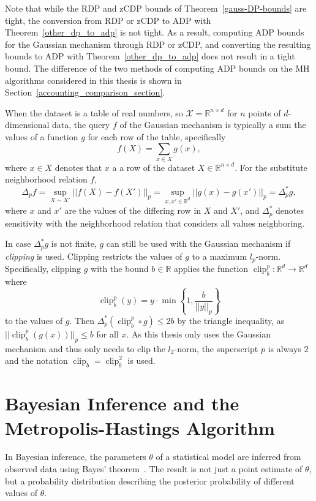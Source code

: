 \documentclass[english,twoside,openright]{HYgraduMLDS}
\newcommand{\R}{\mathbb{R}}
\newcommand{\calx}{{\mathcal{X}}}
\DeclareMathOperator{\clip}{clip}
\begin{document}
Note that while the RDP and zCDP bounds of Theorem~\ref{gauss-DP-bounds} are
tight, the conversion from RDP or zCDP to ADP with Theorem~\ref{other_dp_to_adp}
is not tight. As a result, computing
ADP bounds for the Gaussian mechanism through RDP or zCDP, and converting
the resulting bounds to ADP with Theorem~\ref{other_dp_to_adp} does not
result in a tight bound. The difference of the two methods of computing ADP bounds
on the MH algorithms considered in this thesis is shown in
Section~\ref{accounting_comparison_section}.

When the dataset is a table of real numbers, so \(\calx = \R^{n\times d}\) for
\(n\) points of \(d\)-dimensional data,
the query \(f\) of the Gaussian mechanism is
typically a sum the values of a function \(g\) for each row of the table,
specifically
\[
  f(X) = \sum_{x\in X} g(x),
\]
where \(x\in X\) denotes that \(x\) a a row of the dataset \(X\in \R^{n\times d}\).
For the substitute neighborhood relation \(f\),
\[
  \Delta_{p}f = \sup_{X\sim X'}||f(X) - f(X')||_{p}
  = \sup_{x, x'\in \R^{d}}||g(x) - g(x')||_{p}
  = \Delta^{*}_{p}g,
\]
where \(x\) and \(x'\) are the values of the differing row in \(X\) and \(X'\),
and \(\Delta^{*}_{p}\) denotes sensitivity with the neighborhood relation that
considers all values neighboring.

In case \(\Delta^{*}_{p}g\) is not finite, \(g\) can still be used with
the Gaussian mechanism if \emph{clipping} is used. Clipping restricts the
values of \(g\) to a maximum \(l_{p}\)-norm. Specifically, clipping
\(g\) with the bound \(b\in \R\) applies
the function \(\clip_{b}^{p}\colon \R^{d}\to \R^{d}\) where
\[
  \clip_{b}^{p}(y) = y\cdot\min\left\{1, \frac{b}{||y||_{p}}\right\}
\]
to the values of \(g\). Then \(\Delta^{*}_{p}(\clip_{b}^{p} \circ g) \leq 2b\) by the
triangle inequality, as \(||\clip_{b}^{p}(g(x))||_{p} \leq b\) for
all \(x\). As this thesis only uses the Gaussian mechanism and
thus only needs to clip the \(l_{2}\)-norm, the superscript \(p\) is always
\(2\) and the notation \(\clip_{b} = \clip_{b}^{2}\) is used.

\section{Bayesian Inference and the Metropolis-Hastings Algorithm}\label{MCMC_background}

In Bayesian inference, the parameters \(\theta\) of a statistical model are
inferred from 
observed data using Bayes' theorem~\cite{BDA}. The result is not just a point estimate 
of \(\theta\), but a probability distribution describing the posterior probability
of different values of \(\theta\).
\end{document}
